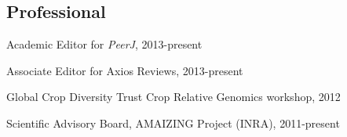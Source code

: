 \documentclass[letterpaper]{article}
\renewenvironment{itemize}{
  \begin{list}{}{
    \setlength{\leftmargin}{1.5em}
  }
}{
  \end{list}
}
\begin{document}
\begin{itemize}
\subsection*{Professional}
\item Academic Editor for \emph{PeerJ}, 2013-present
\item Associate Editor for Axios Reviews, 2013-present
\item Global Crop Diversity Trust Crop Relative Genomics workshop, 2012
\item Scientific Advisory Board, AMAIZING Project (INRA), 2011-present 

\end{itemize}
\end{document}
